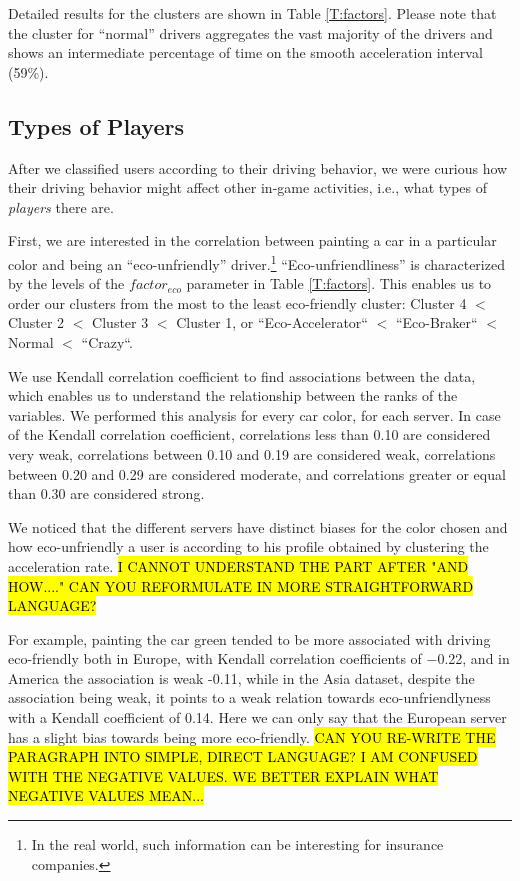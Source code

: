 \documentclass[preprint,authoryear,12pt]{elsarticle}
\begin{document}
Detailed results for the clusters are shown in Table \ref{T:factors}.
Please note that the cluster for ``normal'' drivers aggregates the vast majority of the drivers and shows an intermediate percentage of time on the smooth acceleration interval (59\%).

\subsection{Types of Players}

After we classified users according to their driving behavior, we were curious how their driving behavior might affect other in-game activities, i.e., what types of {\em players\/} there are.

First, we are interested in the correlation between painting a car in a particular color and being an ``eco-unfriendly'' driver.\footnote{In the real world, such information can be interesting for insurance companies.}
``Eco-unfriendliness'' is characterized by the levels of the $factor_{eco}$ parameter in Table \ref{T:factors}. This enables us to order our clusters from the most to the least eco-friendly cluster: Cluster 4 $<$ Cluster 2 $<$ Cluster 3 $<$ Cluster 1, or ``Eco-Accelerator``  $<$ ``Eco-Braker`` $<$  Normal $<$ ``Crazy``.

We use Kendall correlation coefficient to find associations between the data, which enables us to understand the relationship between the ranks of the variables. We performed this analysis for every car color, for each server.
In case of the Kendall correlation coefficient, correlations less than 0.10 are considered very weak, correlations between 0.10 and 0.19 are considered weak, correlations between 0.20 and 0.29 are considered moderate, and correlations greater or equal than 0.30 are considered strong.

We noticed that the different servers have distinct biases for the color chosen and how eco-unfriendly a user is according to his profile obtained by clustering the acceleration rate. \hl{I CANNOT UNDERSTAND THE PART AFTER "AND HOW...." CAN YOU REFORMULATE IN MORE STRAIGHTFORWARD LANGUAGE?}

For example, painting the car green tended to be more associated with driving eco-friendly both in Europe, with Kendall correlation coefficients of $-$0.22, and in America the association is weak -0.11, while in the Asia dataset, despite the association being weak, it points to a weak relation towards eco-unfriendlyness with a Kendall coefficient of 0.14. Here we can only say that the European server has a slight bias towards being more eco-friendly. \hl{CAN YOU RE-WRITE THE PARAGRAPH INTO SIMPLE, DIRECT LANGUAGE? I AM CONFUSED WITH THE NEGATIVE VALUES. WE BETTER EXPLAIN WHAT NEGATIVE VALUES MEAN...}
\end{document}
